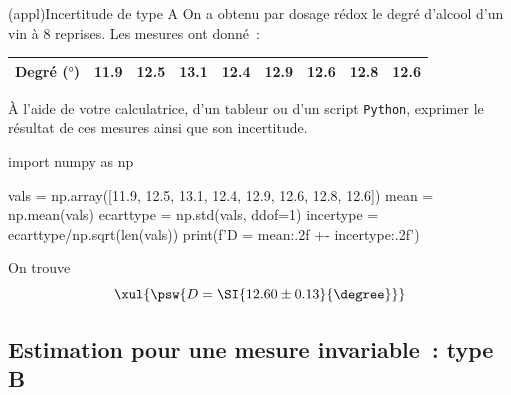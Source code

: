 \documentclass[../../main/main.tex]{subfiles}
\begin{document}
\begin{tcb*}(appl){Incertitude de type A}
	On a obtenu par dosage rédox le degré d'alcool d'un vin à 8 reprises. Les
	mesures ont donné~:
	\begin{center}
		\begin{tabular}{lcccccccc}
			\toprule
			Degré ($\si{\degree}$) &
			\num{11.9}             &
			\num{12.5}             &
			\num{13.1}             &
			\num{12.4}             &
			\num{12.9}             &
			\num{12.6}             &
			\num{12.8}             &
			\num{12.6}
			\\
			\bottomrule
		\end{tabular}
	\end{center}
	À l'aide de votre calculatrice, d'un tableur ou d'un script \texttt{Python},
	exprimer le résultat de ces mesures ainsi que son incertitude.
	\tcblower
	\begin{python}
		import numpy as np

		vals = np.array([11.9, 12.5, 13.1, 12.4, 12.9, 12.6, 12.8, 12.6])
		mean = np.mean(vals)
		ecarttype = np.std(vals, ddof=1)
		incertype = ecarttype/np.sqrt(len(vals))
		print(f'D = {mean:.2f} +- {incertype:.2f}')
	\end{python}
	On trouve
	\[
		\xul{
			\psw{
				D = \SI{12.60 \pm  0.13}{\degree}
			}
		}
	\]
\end{tcb*}

\subsection{Estimation pour une mesure invariable~: type B}
\end{document}

